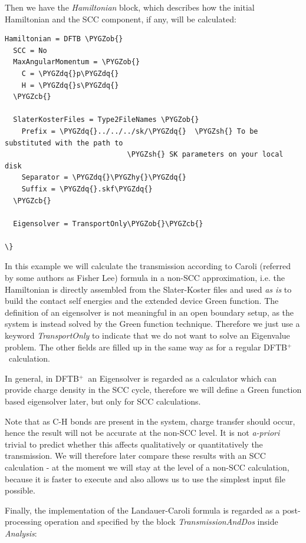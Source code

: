 \documentclass[a4paper,11pt,english]{sphinxmanual}
\newcommand{\dftbp}{\textsf{DFTB$^{\text{+}}$\ }} %
\def\PYGZob{\char`\{}
\def\PYGZcb{\char`\}}
\def\PYGZsh{\char`\#}
\def\PYGZhy{\char`\-}
\def\PYGZdq{\char`\"}
\begin{document}
{{Then we have the \emph{Hamiltonian} block, which describes how the initial
Hamiltonian and the SCC component, if any, will be calculated:

\begin{Verbatim}[commandchars=\\\{\}]
Hamiltonian = DFTB \PYGZob{}
  SCC = No
  MaxAngularMomentum = \PYGZob{}
    C = \PYGZdq{}p\PYGZdq{}
    H = \PYGZdq{}s\PYGZdq{}
  \PYGZcb{}

  SlaterKosterFiles = Type2FileNames \PYGZob{}
    Prefix = \PYGZdq{}../../../sk/\PYGZdq{}  \PYGZsh{} To be substituted with the path to
                             \PYGZsh{} SK parameters on your local disk
    Separator = \PYGZdq{}\PYGZhy{}\PYGZdq{}
    Suffix = \PYGZdq{}.skf\PYGZdq{}
  \PYGZcb{}

  Eigensolver = TransportOnly\PYGZob{}\PYGZcb{}

\}
\end{Verbatim}

In this example we will calculate the transmission according to Caroli
(referred by some authors as Fisher Lee) formula in a non-SCC
approximation, i.e. the Hamiltonian is directly assembled from the
Slater-Koster files and used \emph{as is} to build the contact self
energies and the extended device Green function.  The definition of
an eigensolver is not meaningful in an open boundary setup, as the
system is instead solved by the Green function technique. Therefore
we just use a keyword \emph{TransportOnly} to indicate that we do not want
to solve an Eigenvalue problem. The other fields are filled up in the
same way as for a regular \dftbp calculation.

In general, in \dftbp an Eigensolver is regarded as a calculator
which can provide charge density in the SCC cycle, therefore we will
define a Green function based eigensolver later, but only for SCC
calculations.

Note that as C-H bonds are present in the system, charge transfer
should occur, hence the result will not be accurate at the non-SCC
level. It is not \emph{a-priori} trivial to predict whether this affects
qualitatively or quantitatively the transmission. We will therefore
later compare these results with an SCC calculation - at the moment we
will stay at the level of a non-SCC calculation, because it is faster
to execute and also allows us to use the simplest input file possible.

Finally, the implementation of the Landauer-Caroli formula is regarded
as a post-processing operation and specified by the block
\emph{TransmissionAndDos} inside \emph{Analysis}:

}}
\end{document}
